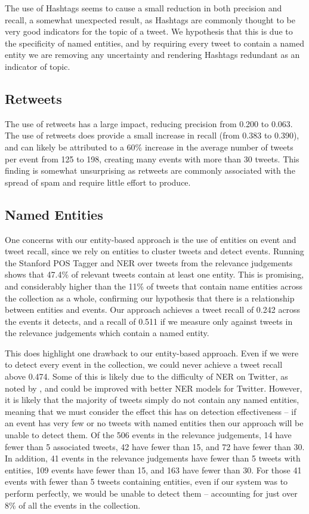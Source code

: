 The use of Hashtags seems to cause a small reduction in both precision and recall, a somewhat unexpected result, as Hashtags are commonly thought to be very good indicators for the topic of a tweet.
We hypothesis that this is due to the specificity of named entities, and by requiring every tweet to contain a named entity we are removing any uncertainty and rendering Hashtags redundant as an indicator of topic.

\subsection{Retweets}
\label{detection:sec:retweetsEval}
The use of retweets has a large impact, reducing precision from 0.200 to 0.063. The use of retweets does provide a small increase in recall (from 0.383 to 0.390), and can likely be attributed to a 60\% increase in the average number of tweets per event from 125 to 198, creating many events with more than 30 tweets. This finding is somewhat unsurprising as retweets are commonly  associated with the spread of spam and require little effort to produce.

\subsection{Named Entities}
\label{detection:sec:entitiesEval}
One concerns with our entity-based approach is the use of entities on event and tweet recall, since we rely on entities to cluster tweets and detect events.
Running the Stanford POS Tagger and NER over tweets from the relevance judgements shows that 47.4\% of relevant tweets contain at least one entity. This is promising, and considerably higher than the 11\% of tweets that contain name entities across the collection as a whole, confirming our hypothesis that there is a relationship between entities and events.
Our approach achieves a tweet recall of 0.242 across the events it detects, and a recall of 0.511 if we measure only against tweets in the relevance judgements which contain a named entity.

This does highlight one drawback to our entity-based approach.
Even if we were to detect every event in the collection, we could never achieve a tweet recall above 0.474.
Some of this is likely due to the difficulty of NER on Twitter, as noted by \cite{DBLP:conf/sigir/LiWHYDSL12}, and could be improved with better NER models for Twitter. However, it is likely that the majority of tweets simply do not contain any named entities, meaning that we must consider the effect this has on detection effectiveness -- if an event has very few or no tweets with named entities then our approach will be unable to detect them.
Of the 506 events in the relevance judgements, 14 have fewer than 5 associated tweets, 42 have fewer than 15, and 72 have fewer than 30.
In addition, 41 events in the relevance judgements have fewer than 5 tweets with entities, 109 events have fewer than 15, and 163 have fewer than 30. For those 41 events with fewer than 5 tweets containing entities, even if our system was to perform perfectly, we would be unable to detect them -- accounting for just over 8\% of all the events in the collection.

